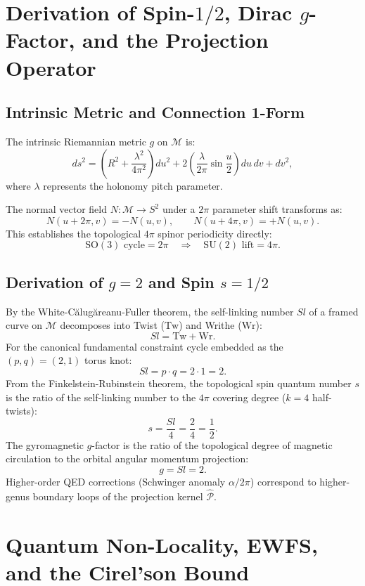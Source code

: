 \documentclass[11pt, a4paper, twocolumn]{article}
\theoremstyle{plain}
\theoremstyle{definition}
\begin{document}
\section{Derivation of Spin-$1/2$, Dirac $g$-Factor, and the Projection Operator}
\label{sec:spin}

\subsection{Intrinsic Metric and Connection 1-Form}
The intrinsic Riemannian metric $g$ on $\mathcal{M}$ is:
\[
ds^2 = \left(R^2 + \frac{\lambda^2}{4\pi^2}\right) du^2 + 2\left(\frac{\lambda}{2\pi} \sin\frac{u}{2}\right) du\,dv + dv^2,
\]
where $\lambda$ represents the holonomy pitch parameter.

The normal vector field $N: \mathcal{M} \to S^2$ under a $2\pi$ parameter shift transforms as:
\[
N(u + 2\pi, v) = -N(u, v), \qquad N(u + 4\pi, v) = +N(u, v).
\]
This establishes the topological $4\pi$ spinor periodicity directly:
\[
\mathrm{SO}(3) \text{ cycle} = 2\pi \quad\Longrightarrow\quad \mathrm{SU}(2) \text{ lift} = 4\pi.
\]

\subsection{Derivation of $g = 2$ and Spin $s = 1/2$}
By the White-Călugăreanu-Fuller theorem, the self-linking number $Sl$ of a framed curve on $\mathcal{M}$ decomposes into Twist ($\mathrm{Tw}$) and Writhe ($\mathrm{Wr}$):
\[
Sl = \mathrm{Tw} + \mathrm{Wr}.
\]
For the canonical fundamental constraint cycle embedded as the $(p,q) = (2,1)$ torus knot:
\[
Sl = p \cdot q = 2 \cdot 1 = 2.
\]
From the Finkelstein-Rubinstein theorem, the topological spin quantum number $s$ is the ratio of the self-linking number to the $4\pi$ covering degree ($k = 4$ half-twists):
\[
s = \frac{Sl}{4} = \frac{2}{4} = \frac{1}{2}.
\]
The gyromagnetic $g$-factor is the ratio of the topological degree of magnetic circulation to the orbital angular momentum projection:
\[
g = Sl = 2.
\]
Higher-order QED corrections (Schwinger anomaly $\alpha / 2\pi$) correspond to higher-genus boundary loops of the projection kernel $\hat{\mathcal{P}}$.

\section{Quantum Non-Locality, EWFS, and the Cirel'son Bound}
\label{sec:ewfs}
\end{document}
